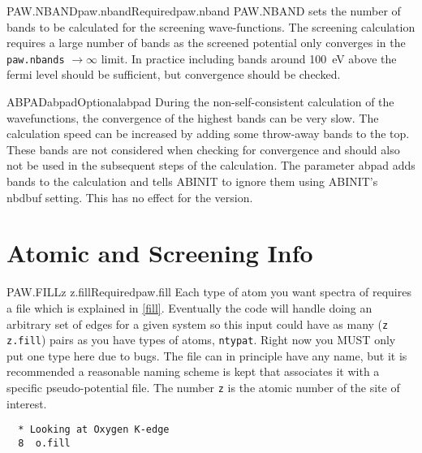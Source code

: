 \documentclass[11pt]{report}
\begin{document}
\begin{Card}{PAW.NBAND}{paw.nband}{Required}{paw.nband}
PAW.NBAND sets the number of bands to be calculated for the screening wave-functions. The screening calculation requires a large number of bands as the screened potential only converges in the \texttt{paw.nbands} $\rightarrow \infty$ limit. In practice including bands around 100~eV above the fermi level should be sufficient, but convergence should be checked. 
\end{Card}

\begin{Card}{ABPAD}{abpad}{Optional}{abpad}
During the non-self-consistent calculation of the wavefunctions, the convergence of the highest bands can be very slow. The calculation speed can be increased by adding some throw-away bands to the top. These bands are not considered when checking for convergence and should also not be used in the subsequent steps of the calculation. The parameter abpad adds bands to the calculation and tells ABINIT to ignore them using ABINIT's nbdbuf setting. This has no effect for the  version. 
\end{Card}




\section{Atomic and Screening Info}
\label{sec:AS-Info}

\begin{Card}{PAW.FILL}{z z.fill}{Required}{paw.fill}
Each type of atom you want spectra of requires a  file which is explained in \ref{fill}. Eventually the code will handle doing an arbitrary set of edges for a given system so this input could have as many (\texttt{z} \texttt{z.fill}) pairs as you have types of atoms, \texttt{ntypat}. Right now you MUST only put one type here due to bugs. The file  can in principle have any name, but it is recommended a reasonable naming scheme is kept that associates it with a specific pseudo-potential file. The number \texttt{z} is the atomic number of the site of interest.

\begin{verbatim}
  * Looking at Oxygen K-edge
  8  o.fill
\end{verbatim}
\end{Card}
\end{document}

